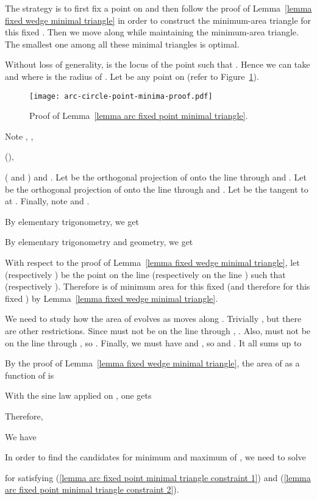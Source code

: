 \documentclass[11pt, oneside]{article}
\begin{document}
\proof
The strategy is to first fix a point  on 
and then follow the proof of Lemma~\ref{lemma fixed wedge minimal triangle}
in order to construct the minimum-area triangle for this fixed .
Then we move  along 
while maintaining the minimum-area triangle.
The smallest one among all these minimal triangles is optimal.

Without loss of generality,
 is the locus of the point 
such that .
Hence we can take
 and 
where  is the radius of .
Let  be any point on 
(refer to Figure~\ref{arc-circle-point-minima-proof}).
\begin{figure}
\centering
\texttt{[image: arc-circle-point-minima-proof.pdf]}
\caption{Proof of Lemma~\ref{lemma arc fixed point minimal triangle}.\label{arc-circle-point-minima-proof}}
\end{figure}
Note ,
,

(),

( and )
and .
Let  be the orthogonal projection of 
onto the line through  and .
Let  be the orthogonal projection of 
onto the line through  and .
Let  be the tangent to  at .
Finally, 
note  and .

By elementary trigonometry,
we get

By elementary trigonometry and geometry,
we get


With respect to the proof of Lemma~\ref{lemma fixed wedge minimal triangle},
let  (respectively )
be the point on the line 
(respectively on the line )
such that 
(respectively ).
Therefore  
is of minimum area for this fixed 
(and therefore for this fixed )
by Lemma~\ref{lemma fixed wedge minimal triangle}.

We need to study how the area of  evolves 
as  moves along .
Trivially ,
but there are other restrictions.
Since  must not be on the line through ,
.
Also,
 must not be on the line through ,
so .
Finally,
we must have  and ,
so 
and .
It all sums up to

By the proof of Lemma~\ref{lemma fixed wedge minimal triangle},
the area of  
as a function of  is

With the sine law applied on ,
one gets

Therefore,


We have

In order to find the candidates for minimum and maximum of ,
we need to solve

for  satisfying (\ref{lemma arc fixed point minimal triangle constraint 1})
and (\ref{lemma arc fixed point minimal triangle constraint 2}).
\end{document}
